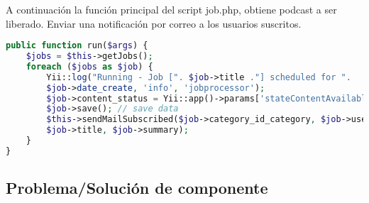\begin{itemize}
A continuación la función principal del script job.php, obtiene podcast
a ser liberado. Enviar una notificación por correo a los usuarios suscritos.

\begin{lstlisting}[language=PHP, caption={Método principal de clase JobCommand.}]
public function run($args) {
    $jobs = $this->getJobs();
    foreach ($jobs as $job) {
        Yii::log("Running - Job [". $job->title ."] scheduled for ".
        $job->date_create, 'info', 'jobprocessor');
        $job->content_status = Yii::app()->params['stateContentAvailable'];
        $job->save(); // save data
        $this->sendMailSubscribed($job->category_id_category, $job->user_id_user,
        $job->title, $job->summary);
    }
}
\end{lstlisting}

\end{itemize}

\subsection{Problema/Solución de componente}

